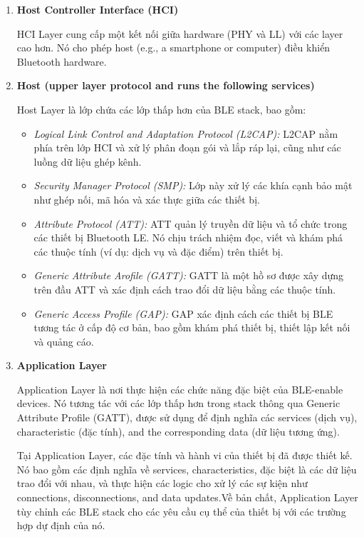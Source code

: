\begin{enumerate}[label=\arabic*)]
\item\textbf{Host Controller Interface (HCI)}

HCI Layer cung cấp một kết nối giữa hardware (PHY và LL) với các layer cao hơn. Nó cho phép host (e.g., a smartphone or computer) điều khiển Bluetooth hardware.

\item\textbf{Host (upper layer protocol and runs the following services)}

Host Layer là lớp chứa các lớp thấp hơn của BLE stack, bao gồm:
\begin{itemize}[label=-]
	\item \textit{Logical Link Control and Adaptation Protocol (L2CAP):} L2CAP nằm phía trên lớp HCI và xử lý phân đoạn gói và lắp ráp lại, cũng như các luồng dữ liệu ghép kênh.
	
	\item \textit{Security Manager Protocol (SMP):} Lớp này xử lý các khía cạnh bảo mật như ghép nối, mã hóa và xác thực giữa các thiết bị.
	
	\item \textit{Attribute Protocol (ATT):} ATT quản lý truyền dữ liệu và tổ chức trong các thiết bị Bluetooth LE. Nó chịu trách nhiệm đọc, viết và khám phá các thuộc tính (ví dụ: dịch vụ và đặc điểm) trên thiết bị.
	
	\item \textit{Generic Attribute Arofile (GATT):} GATT là một hồ sơ được xây dựng trên đầu ATT và xác định cách trao đổi dữ liệu bằng các thuộc tính.
	
	\item \textit{Generic Access Profile (GAP):} GAP xác định cách các thiết bị BLE tương tác ở cấp độ cơ bản, bao gồm khám phá thiết bị, thiết lập kết nối và quảng cáo.
\end{itemize}


\item\textbf{Application Layer}

Application Layer là nơi thực hiện các chức năng đặc biệt của BLE-enable devices. Nó tương tác với các lớp thấp hơn trong stack thông qua Generic Attribute Profile (GATT), được sử dụng để định nghĩa các services (dịch vụ), characteristic (đặc tính), and the corresponding data (dữ liệu tương ứng).

Tại Application Layer, các đặc tính và hành vi của thiết bị đã được thiết kế. Nó bao gồm các định nghĩa về services, characteristics, đặc biệt là các dữ liệu trao đổi với nhau, và thực hiện các logic cho xử lý các sự kiện như connections, disconnections, and data updates.Về bản chất, Application Layer tùy chỉnh các BLE stack cho các yêu cầu cụ thể của thiết bị với các trường hợp dự định của nó.
\end{enumerate}

